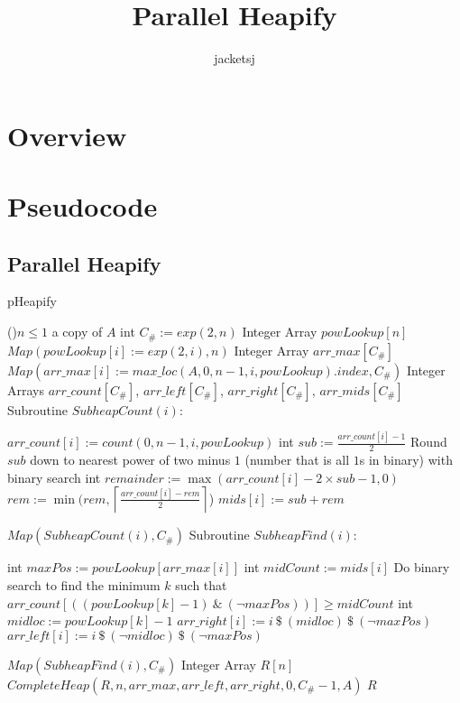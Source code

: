 \documentclass[letterpaper, reqno, 11pt]{article}
\newcommand{\ttitle}{Parallel Heapify}
\newcommand{\tname}{jacketsj}
\begin{document}
\title{\ttitle}
\author{\tname}

\maketitle

\section*{Overview}

\section*{Pseudocode}

\subsection*{Parallel Heapify}
\begin{algorithm}[H]
\caption{pHeapify}
\If(){$n\leq1$}
{
	\Return a copy of $A$\;
}
int $C_\#:=exp(2, n)$
Integer Array $powLookup[n]$\;
$Map(powLookup[i]:=exp(2,i),n)$
Integer Array $arr\_max[C_\#]$
$Map(arr\_max[i]:=max\_loc(A,0,n-1,i,powLookup).index, C_\#)$\;
Integer Arrays $arr\_count[C_\#]$, $arr\_left[C_\#]$, $arr\_right[C_\#]$, $arr\_mids[C_\#]$\;
Subroutine $SubheapCount(i)$:
\begin{description}
	\item{}
	$arr\_count[i]:=count(0,n-1,i,powLookup)$\;
	int $sub:=\frac{arr\_count[i]-1}{2}$\;
	Round $sub$ down to nearest power of two minus $1$
	(number that is all $1$s in binary) with binary search\;
	int $remainder:=\max(arr\_count[i]-2\times sub-1,0)$
	$rem:=\min(rem,\left\lceil\frac{arr\_count[i]-rem}{2}\right\rceil$)
	$mids[i]:=sub+rem$
\end{description}
$Map(SubheapCount(i), C_\#)$\;
Subroutine $SubheapFind(i)$:
\begin{description}
	\item{}
	int $maxPos:=powLookup[arr\_max[i]]$
	int $midCount:=mids[i]$
	Do binary search to find the minimum $k$ such that
	$arr\_count[((powLookup[k]-1)\ \&\ (\neg maxPos))]\geq midCount$
	int $midloc:=powLookup[k]-1$
	$arr\_right[i]:=i\ \$\ (midloc)\ \$\ (\neg maxPos)$\;
	$arr\_left[i]:=i\ \$\ (\neg midloc)\ \$\ (\neg maxPos)$\;
\end{description}
$Map(SubheapFind(i), C_\#)$\;
Integer Array $R[n]$\;
$CompleteHeap(R, n, arr\_max, arr\_left, arr\_right, 0, C_\#-1, A)$\;
\Return $R$\;
\end{algorithm}
\end{document}
